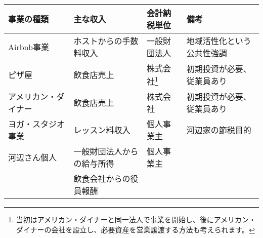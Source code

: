 \begin{minipage}{120mm}
  \begin{tabular}{llll}
\hline
 事業の種類   & 主な収入 & 会計納税単位 & 備考 \\
\hline
  Airbnb事業 & ホストからの手数料収入 & 一般財団法人 & 地域活性化という公共性強調 \\
  ピザ屋 & 飲食店売上 & 株式会社\footnote{当初はアメリカン・ダイナーと同一法人で事業を開始し、後にアメリカン・ダイナーの会社を設立し、必要資産を営業譲渡する方法も考えられます。} & 初期投資が必要、従業員あり \\
  アメリカン・ダイナー & 飲食店売上 & 株式会社 & 初期投資が必要、従業員あり \\
  ヨガ・スタジオ事業 & レッスン料収入 & 個人事業主 & 河辺家の節税目的 \\
  河辺さん個人 & 一般財団法人からの給与所得 & 個人事業主 & \\
  & 飲食会社からの役員報酬 &  & \\
  \hline
  \end{tabular}
\end{minipage}